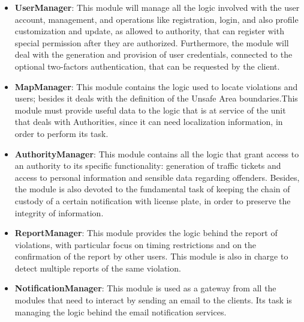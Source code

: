 \begin{itemize}
  \item \textbf{UserManager}: This module will manage all the logic involved with the user account, management, and operations 
  like registration, login, and also profile customization and update, as allowed to authority, that can register 
  with special permission after they are authorized. Furthermore, the module will deal with the generation and provision 
  of user credentials, connected to the optional two-factors authentication, that can be requested by the client.
  \item \textbf{MapManager}: This module contains the logic used to locate violations and users; besides it deals with the 
  definition of the Unsafe Area boundaries.This module must provide useful data to the logic that is at service of the unit 
  that deals with  Authorities, since it can need localization information, in order to perform its task.
  \item \textbf{AuthorityManager}: This module contains all the logic that grant access to an authority to its specific functionality: 
  generation of traffic tickets and access to personal information and sensible data regarding offenders. Besides, 
  the module is also devoted to the fundamental task of keeping the chain of custody of a certain notification with 
  license plate, in order to preserve the integrity of information.
  \item \textbf{ReportManager}: This module provides the logic behind the report of violations, with particular 
  focus on timing restrictions and on the confirmation of the report by other users. This module is also in charge 
  to detect multiple reports of the same violation.
  \item \textbf{NotificationManager}: This module is used as a gateway from all the modules that need to interact by 
  sending an email to the clients. Its task is managing the logic behind the email notification services.
\end{itemize}

